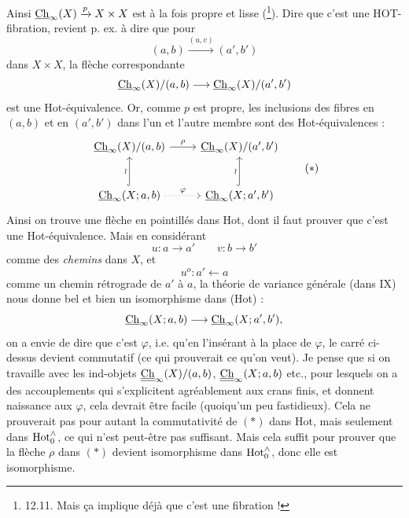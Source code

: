 Ainsi $\underline{\mathrm{Ch}}_\infty(X) \xrightarrow{p} X \times X$ est à la fois propre et lisse (\footnote[37]{12.11. Mais ça implique déjà que c'est une fibration !}). Dire que c'est une HOT-fibration, revient p. ex. à dire que pour
\[
(a,b) \xrightarrow{(u,v)} (a',b')
\]
dans $X \times X$, la flèche correspondante
\[
\underline{\mathrm{Ch}}_\infty(X)/(a,b) \longrightarrow \underline{\mathrm{Ch}}_\infty(X)/(a',b')
\]
est une Hot-équivalence. Or, comme $p$ est propre, les inclusions des fibres en $(a,b)$ et en $(a',b')$ dans l'un et l'autre membre sont des Hot-équivalences :
\[
\begin{tikzcd}[row sep=large]
\Ch_\infty(X)/(a,b) \arrow[r, "\rho"] & \Ch_\infty(X)/(a',b') \\
\Ch_\infty(X;a,b) \arrow[u, hook, "\wr"] \arrow[r, dotted, "\varphi"] & \Ch_\infty(X;a',b') \arrow[u, hook, "\wr"]
\end{tikzcd}
\tag*{$(*)$}
\]
Ainsi on trouve une flèche en pointillés dans Hot, dont il faut prouver que c'est une Hot-équivalence. Mais en considérant
\[
u : a \longrightarrow a' \qquad v : b \longrightarrow b'
\]
comme des \textit{chemins} dans $X$, et
\[
u^o : a' \longleftarrow a
\]
comme un chemin rétrograde de $a'$ à $a$, la théorie de variance générale (dans IX) nous donne bel et bien un isomorphisme dans (Hot) :
\[
\underline{\mathrm{Ch}}_\infty(X;a,b) \longrightarrow \underline{\mathrm{Ch}}_\infty(X;a',b'),
\]
on a envie de dire que c'est $\varphi$, i.e. qu'en l'insérant à la place de $\varphi$, le carré ci-dessus devient commutatif (ce qui prouverait ce qu'on veut). Je pense que si on travaille avec les ind-objets $\underline{\underline{\mathrm{Ch}}}_\infty(X)/(a,b)$, $\underline{\underline{\mathrm{Ch}}}_\infty(X;a,b)$ etc., pour lesquels on a des accouplements qui s'explicitent agréablement aux crans finis, et donnent naissance aux $\varphi$, cela devrait être facile (quoiqu'un peu fastidieux). Cela ne prouverait pas pour autant la commutativité de $(*)$ dans Hot, mais
seulement dans $\mathrm{Hot}^{\wedge}_{0}$, ce qui n'est peut-être pas suffisant. Mais cela suffit pour prouver que la flèche $\rho$ dans $(*)$ devient isomorphisme dans $\mathrm{Hot}^{\wedge}_{0}$, donc elle est isomorphisme.

